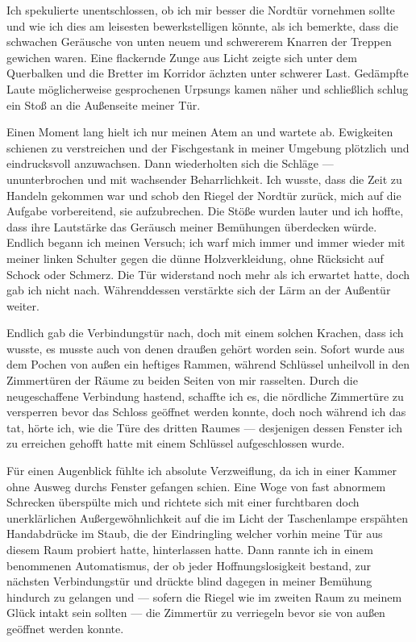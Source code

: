 Ich spekulierte unentschlossen, ob ich mir besser die Nordtür vornehmen sollte und wie ich dies am leisesten bewerkstelligen könnte, als ich bemerkte, dass die schwachen Geräusche von unten neuem und schwererem Knarren der Treppen gewichen waren. Eine flackernde Zunge aus Licht zeigte sich unter dem Querbalken und die Bretter im Korridor ächzten unter schwerer Last. Gedämpfte Laute möglicherweise gesprochenen Urpsungs kamen näher und schließlich schlug ein Stoß an die Außenseite meiner Tür.

Einen Moment lang hielt ich nur meinen Atem an und wartete ab. Ewigkeiten schienen zu verstreichen und der Fischgestank in meiner Umgebung plötzlich und eindrucksvoll anzuwachsen. Dann wiederholten sich die Schläge --- ununterbrochen und mit wachsender Beharrlichkeit. Ich wusste, dass die Zeit zu Handeln gekommen war und schob den Riegel der Nordtür zurück, mich auf die Aufgabe vorbereitend, sie aufzubrechen. Die Stöße wurden lauter und ich hoffte, dass ihre Lautstärke das Geräusch meiner Bemühungen überdecken würde. Endlich begann ich meinen Versuch; ich warf mich immer und immer wieder mit meiner linken Schulter gegen die dünne Holzverkleidung, ohne Rücksicht auf Schock oder Schmerz. Die Tür widerstand noch mehr als ich erwartet hatte, doch gab ich nicht nach. Währenddessen verstärkte sich der Lärm an der Außentür weiter.

Endlich gab die Verbindungstür nach, doch mit einem solchen Krachen, dass ich wusste, es musste auch von denen draußen gehört worden sein. Sofort wurde aus dem Pochen von außen ein heftiges Rammen, während Schlüssel unheilvoll in den Zimmertüren der Räume zu beiden Seiten von mir rasselten. Durch die neugeschaffene Verbindung hastend, schaffte ich es, die nördliche Zimmertüre zu versperren bevor das Schloss geöffnet werden konnte, doch noch während ich das tat, hörte ich, wie die Türe des dritten Raumes --- desjenigen dessen Fenster ich zu erreichen gehofft hatte mit einem Schlüssel aufgeschlossen wurde.

Für einen Augenblick fühlte ich absolute Verzweiflung, da ich in einer Kammer ohne Ausweg durchs Fenster gefangen schien. Eine Woge von fast abnormem Schrecken überspülte mich und richtete sich mit einer furchtbaren doch unerklärlichen Außergewöhnlichkeit auf die im Licht der Taschenlampe erspähten Handabdrücke im Staub, die der Eindringling welcher vorhin meine Tür aus diesem Raum probiert hatte, hinterlassen hatte. Dann rannte ich in einem benommenen Automatismus, der ob jeder Hoffnungslosigkeit bestand, zur nächsten Verbindungstür und drückte blind dagegen in meiner Bemühung hindurch zu gelangen und --- sofern die Riegel wie im zweiten Raum zu meinem Glück intakt sein sollten --- die Zimmertür zu verriegeln bevor sie von außen geöffnet werden konnte.

